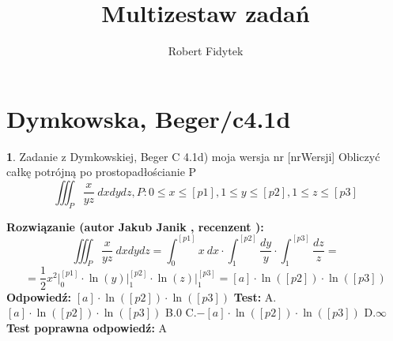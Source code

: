 \documentclass[12pt, a4paper]{article}
\title{Multizestaw zadań}
\author{Robert Fidytek}
\date{}
\theoremstyle{definition} %
\newtheorem{zad}{}
\newcommand{\kategoria}[1]{\section{#1}} %
\newcommand{\zadStart}[1]{\begin{zad}#1\newline} %
\newcommand{\zadStop}{\end{zad}}   %
\newcommand{\rozwStart}[2]{\noindent \textbf{Rozwiązanie (autor #1 , recenzent #2): }\newline} %
\newcommand{\rozwStop}{\newline}                                            %
\newcommand{\odpStart}{\noindent \textbf{Odpowiedź:}\newline}    %
\newcommand{\odpStop}{\newline}                                             %
\newcommand{\testStart}{\noindent \textbf{Test:}\newline} %
\newcommand{\testStop}{\newline} %
\newcommand{\kluczStart}{\noindent \textbf{Test poprawna odpowiedź:}\newline} %
\newcommand{\kluczStop}{\newline} %
\begin{document}
\maketitle


\kategoria{Dymkowska, Beger/c4.1d}
\zadStart{Zadanie z Dymkowskiej, Beger C 4.1d) moja wersja nr [nrWersji]}
Obliczyć całkę potrójną po prostopadłościanie P $$\iiint_P \frac{x}{yz}\ dxdydz, P: 0 \leq x \leq [p1], 1 \leq y \leq [p2], 1 \leq z \leq [p3]$$
\zadStop
\rozwStart{Jakub Janik}{}
$$\iiint_P \frac{x}{yz}\ dxdydz=\int_0^{[p1]}x\ dx \cdot \int_1^{[p2]}\frac{dy}{y}\cdot \int_1^{[p3]}\frac{dz}{z}=$$
$$=\frac{1}{2}x^2\Big|_0^{[p1]}\cdot \ln{(y)}\Big|_1^{[p2]}\cdot \ln{(z)}\Big|_1^{[p3]}=[a]\cdot \ln{([p2])}\cdot \ln{([p3])}$$
\rozwStop
\odpStart
$[a]\cdot \ln{([p2])}\cdot \ln{([p3])}$
\odpStop
\testStart
A.$[a]\cdot \ln{([p2])}\cdot \ln{([p3])}$
B.$0$
C.$-[a]\cdot \ln{([p2])}\cdot \ln{([p3])}$
D.$\infty$
\testStop
\kluczStart
A
\kluczStop
\end{document}
